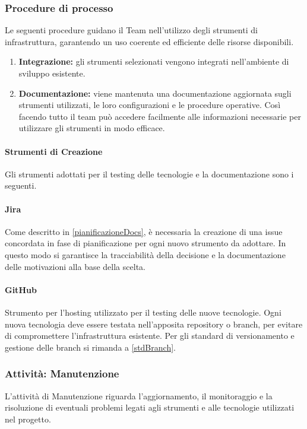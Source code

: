 \documentclass[a4paper,12pt]{article}
\begin{document}
\subsubsection{Procedure di processo}
Le seguenti procedure guidano il Team nell'utilizzo degli strumenti di
infrastruttura, garantendo un uso coerente ed efficiente delle risorse
disponibili.
\begin{enumerate}
    \item \textbf{Integrazione:} gli strumenti selezionati vengono integrati nell'ambiente di sviluppo esistente. 
    \item \textbf{Documentazione:} viene mantenuta una documentazione aggiornata sugli strumenti utilizzati, le loro configurazioni e le procedure operative. 
    Così facendo tutto il team può accedere facilmente alle informazioni necessarie per utilizzare gli strumenti in modo efficace.
\end{enumerate}

\paragraph{Strumenti di Creazione}
Gli strumenti adottati per il testing delle tecnologie e la documentazione sono i seguenti.
\paragraph{Jira} \label{Jira}
Come descritto in \ref{pianificazioneDocs}, è necessaria la creazione di una issue concordata in fase di pianificazione per ogni nuovo strumento da adottare. 
In questo modo si garantisce la tracciabilità della decisione e la documentazione delle motivazioni alla base della scelta.
\paragraph{GitHub} \label{GitHub}
Strumento per l'hosting utilizzato per il testing delle nuove tecnologie. 
Ogni nuova tecnologia deve essere testata nell'apposita repository o branch, per evitare di compromettere l'infrastruttura esistente.
Per gli standard di versionamento e gestione delle branch si rimanda a \ref{stdBranch}.

\subsubsection{Attività: Manutenzione}
L'attività di Manutenzione riguarda l'aggiornamento, il monitoraggio e la risoluzione di eventuali problemi legati agli strumenti e alle tecnologie
utilizzati nel progetto.
\end{document}
